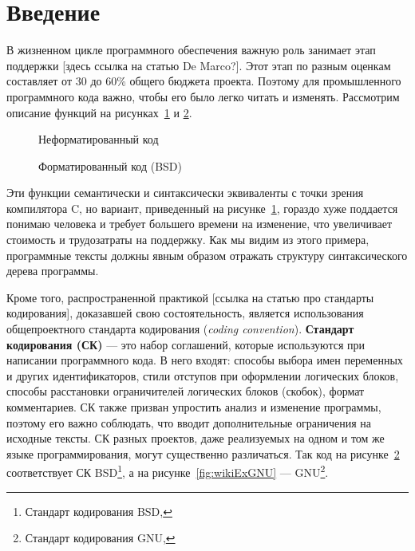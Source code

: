 \section*{Введение}

В жизненном цикле программного обеспечения важную роль занимает этап
поддержки [здесь ссылка на статью De Marco?]. Этот этап по разным оценкам
составляет от 30 до 60\% общего бюджета проекта. Поэтому для
промышленного программного кода важно, чтобы его было легко читать и изменять.
Рассмотрим описание функций
на рисунках~\ref{fig:wikiExUnfor} и \ref{fig:wikiExBSD}.

\begin{figure}[h!]
	\centering
	
	\caption{Неформатированный код}
	\label{fig:wikiExUnfor}
\end{figure}

\begin{figure}[h!]
	\centering
	
  \caption{Форматированный код (BSD)}
	\label{fig:wikiExBSD}
\end{figure}

Эти функции семантически и синтаксически эквиваленты с точки зрения
компилятора C, но вариант, приведенный на
рисунке~\ref{fig:wikiExUnfor}, гораздо хуже
поддается понимаю человека и требует большего времени на изменение,
что увеличивает стоимость и трудозатраты на поддержку. Как мы видим из этого
примера, программные тексты должны явным образом отражать
структуру синтаксического дерева программы.

Кроме того, распространенной практикой [ссылка на статью про стандарты
кодирования], доказавшей свою состоятельность, является использования
общепроектного стандарта кодирования (\textit{coding convention}).
\textbf{Стандарт кодирования (СК)} ---
это набор соглашений, которые используются
при написании программного кода. В него входят: способы выбора имен переменных
и других идентификаторов, стили отступов при оформлении логических блоков,
способы расстановки ограничителей логических блоков (скобок),
формат комментариев. СК также призван упростить анализ и изменение
программы, поэтому его важно соблюдать, что вводит
дополнительные ограничения на исходные тексты. СК разных проектов, даже
реализуемых на одном и том же языке программирования, могут существенно
различаться.
Так код на рисунке~\ref{fig:wikiExBSD} соответствует СК BSD\footnote{
Стандарт кодирования BSD, },
а на рисунке~\ref{fig:wikiExGNU} --- GNU\footnote{
Стандарт кодирования GNU, }.

